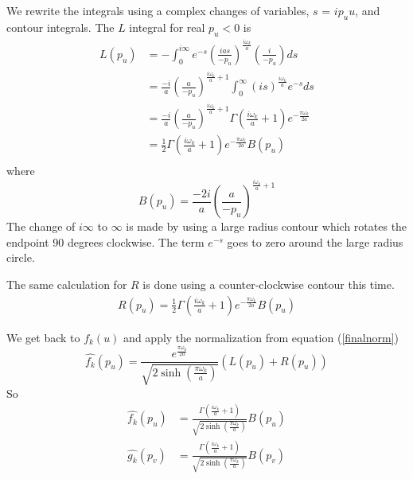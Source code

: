 \documentclass[12pt,a4paper]{article}
\begin{document}
We rewrite the integrals using a complex changes of variables, $s$ = $ip_uu$, and contour integrals.
The $L$ integral for real $p_u<0$ is
\begin{equation}
\begin{split}
  L(p_u) & = -\int_0^{i\infty} e^{-s}\left(\frac{ias}{-p_u}\right)^\frac{i\omega_k}{a} \left(\frac{i}{-p_u}\right)ds \\
  & = \frac{-i}{a} \left(\frac{a}{-p_u}\right)^{\frac{i\omega_k}{a} + 1} \int_0^\infty \left(is\right) ^ \frac{i\omega_k}{a} e^{-s} ds \\
  & = \frac{-i}{a} \left(\frac{a}{-p_u}\right)^{\frac{i\omega_k}{a} + 1} \Gamma\left(\frac{i\omega_k}{a} + 1\right) e^{-\frac{\pi \omega_k}{2a}} \\
  & = \frac{1}{2} \Gamma\left(\frac{i\omega_k}{a} + 1\right) e^{-\frac{\pi \omega_k}{2a}} B(p_u)\\
\end{split}
\end{equation}
where
\begin{equation}
B(p_u) = \frac{-2i}{a} \left(\frac{a}{-p_u}\right)^{\frac{i\omega_k}{a} + 1} 
\end{equation}
The change of $i\infty$ to $\infty$ is made by using a large radius contour which rotates the endpoint 90 degrees clockwise.  The term $e^{-s}$ goes to zero around the large radius circle.

The same calculation for $R$ is done using a counter-clockwise contour this time.
\begin{equation}
\begin{split}
  R(p_u) = \frac{1}{2}\Gamma\left(\frac{i\omega_k}{a} + 1\right) e^{-\frac{\pi \omega_k}{2a}} B(p_u)
\end{split}
\end{equation}

We get back to $f_k(u)$ and apply the normalization from equation (\ref{finalnorm})
\begin{equation}
\widehat{f_k}(p_u) = \frac{e^{\frac{\pi \omega_k}{2a}}}{\sqrt{2 \sinh \left({\frac{\pi\omega_k}{a}}\right)}}  ( L(p_u) + R(p_u) )
\end{equation}
So
\begin{equation}
\label{fourier}
\begin{split}
\widehat{f_k}(p_u) & = \frac{\Gamma\left(\frac{i\omega_k}{a} + 1\right)}{\sqrt{2 \sinh \left({\frac{\pi\omega_k}{a}}\right)}} B(p_u)\\
\widehat{g_k}(p_v) &= \frac{\Gamma\left(\frac{i\omega_k}{a} + 1\right)}{\sqrt{2 \sinh \left({\frac{\pi\omega_k}{a}}\right)}} B(p_v)
\end{split}
\end{equation}
\end{document}
